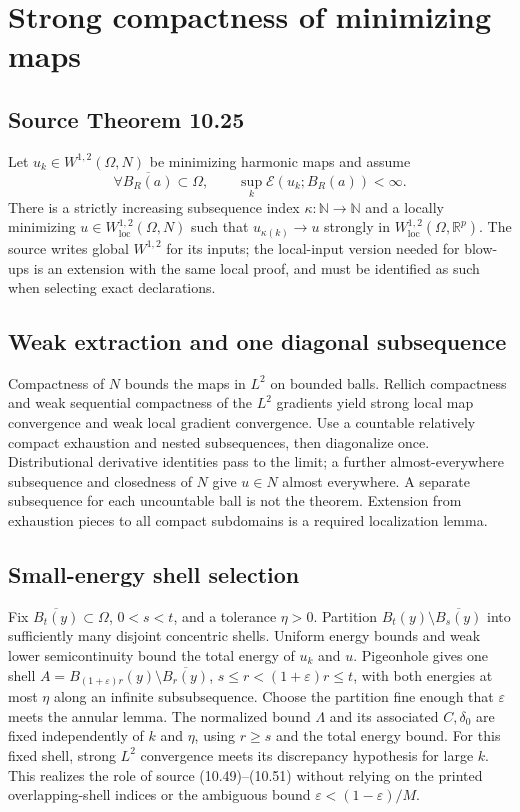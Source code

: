 \documentclass[11pt,a4paper]{article}
\numberwithin{equation}{section}
\theoremstyle{definition}
\theoremstyle{remark}
\newcommand{\R}{\mathbb R}
\newcommand{\N}{\mathbb N}
\newcommand{\E}{\mathcal E}
\newcommand{\loc}{\mathrm{loc}}
\begin{document}
\section{Strong compactness of minimizing maps}
\subsection{Source Theorem 10.25}\label{thm:compactness}
Let $u_k\in W^{1,2}(\Omega,N)$ be minimizing harmonic maps and assume
\begin{equation}\label{eq:equi-energy}
 \forall\overline{B_R(a)}\subset\Omega,\qquad
 \sup_k\E(u_k;B_R(a))<\infty.
\end{equation}
There is a strictly increasing subsequence index $\kappa:\N\to\N$ and
a locally minimizing $u\in W^{1,2}_{\loc}(\Omega,N)$ such that
$u_{\kappa(k)}\to u$ strongly in $W^{1,2}_{\loc}(\Omega,\R^p)$.
The source writes global $W^{1,2}$ for its inputs; the local-input version
needed for blow-ups is an extension with the same local proof, and must be
identified as such when selecting exact declarations.

\subsection{Weak extraction and one diagonal subsequence}
\label{step:weak-extraction}
Compactness of $N$ bounds the maps in $L^2$ on bounded balls.
Rellich compactness and weak sequential compactness of the $L^2$ gradients
yield strong local map convergence and weak local gradient convergence.
Use a countable relatively compact exhaustion and nested subsequences,
then diagonalize once. Distributional derivative identities pass to the
limit; a further almost-everywhere subsequence and closedness of $N$ give
$u\in N$ almost everywhere. A separate subsequence for each uncountable
ball is not the theorem. Extension from exhaustion pieces to all compact
subdomains is a required localization lemma.

\subsection{Small-energy shell selection}\label{step:small-shell}
Fix $\overline{B_t(y)}\subset\Omega$, $0<s<t$, and a tolerance $\eta>0$.
Partition $B_t(y)\setminus\overline{B_s(y)}$ into sufficiently many
disjoint concentric shells. Uniform energy bounds and weak lower
semicontinuity bound the total energy of $u_k$ and $u$. Pigeonhole gives
one shell $A=B_{(1+\varepsilon)r}(y)\setminus\overline{B_r(y)}$,
$s\le r<(1+\varepsilon)r\le t$, with both energies at most $\eta$
along an infinite subsubsequence. Choose the partition fine enough that
$\varepsilon$ meets the annular lemma. The normalized bound $\Lambda$
and its associated $C,\delta_0$ are fixed independently of $k$ and
$\eta$, using $r\ge s$ and the total energy bound. For this fixed shell,
strong $L^2$ convergence meets its discrepancy hypothesis for large $k$.
This realizes the role of source (10.49)--(10.51) without relying on the
printed overlapping-shell indices or the ambiguous bound
$\varepsilon<(1-\varepsilon)/M$.
\end{document}

